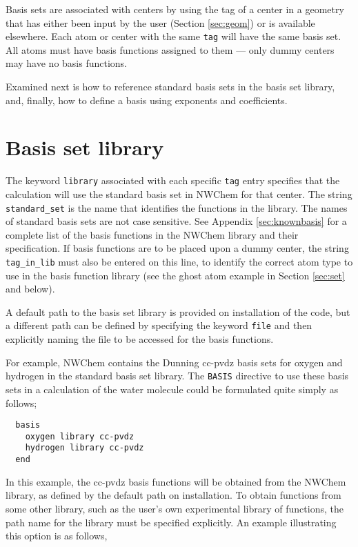 Basis sets are associated with centers by using the tag of a center in
a geometry that has either been input by the user (Section
\ref{sec:geom}) or is available elsewhere.  Each atom or center with
the same \verb+tag+ will have the same basis set.  All atoms must have
basis functions assigned to them --- only dummy centers may have no
basis functions.

Examined next is how to reference standard basis sets in the basis set
library, and, finally, how to define a basis using exponents and
coefficients.

\section{Basis set library}

The keyword \verb+library+ associated with each specific \verb+tag+
entry specifies that the calculation will use the
standard basis set in NWChem for that center.  The string \verb+standard_set+ is the
name that identifies the functions in the library.  The names of
standard basis sets are not case sensitive.  See Appendix
\ref{sec:knownbasis} for a complete list of the basis functions in the
NWChem library and their specification.  If basis functions are to be
placed upon a dummy center, the string \verb+tag_in_lib+ must also be
entered on this line, to identify the correct atom type to use in the
basis function library (see the ghost atom example in Section
\ref{sec:set} and below).

A default path to the basis set library is provided on installation of
the code, but a different path can be defined by specifying the
keyword \verb+file+ and then explicitly naming the file to be accessed
for the basis functions.

For example, NWChem contains the Dunning cc-pvdz basis sets for
oxygen and hydrogen in the standard basis set library.  The \verb+BASIS+
directive to use these basis sets in a calculation of the water molecule
could be formulated quite simply as follows;

\begin{verbatim}
  basis
    oxygen library cc-pvdz
    hydrogen library cc-pvdz
  end
\end{verbatim}

In this example, the cc-pvdz basis functions will be obtained from the
NWChem library, as defined by the default path on installation.  To obtain
functions from some other library, such as the user's own experimental
library of functions, the path name for the library must be specified
explicitly.  An example illustrating this option is as follows,

